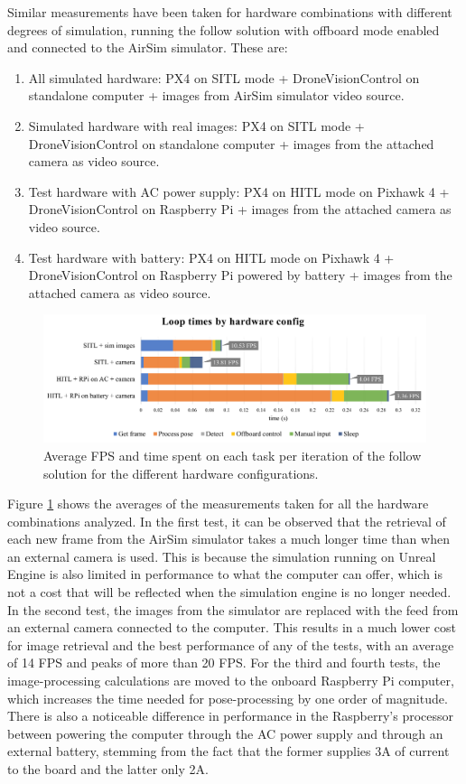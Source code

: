 Similar measurements have been taken for hardware combinations with different degrees of simulation, running the follow solution with offboard mode enabled and connected to the AirSim simulator.
These are:
\begin{enumerate}
    \item All simulated hardware: PX4 on SITL mode + DroneVisionControl on standalone computer + images from AirSim simulator video source.
    \item Simulated hardware with real images: PX4 on SITL mode + DroneVisionControl on standalone computer + images from the attached camera as video source.
    \item Test hardware with AC power supply: PX4 on HITL mode on Pixhawk 4 + DroneVisionControl on Raspberry Pi + images from the attached camera as video source.
    \item Test hardware with battery: PX4 on HITL mode on Pixhawk 4 + DroneVisionControl on Raspberry Pi powered by battery + images from the attached camera as video source.
\end{enumerate}


\begin{figure}
  \centering
  \includegraphics[width=\textwidth, keepaspectratio]{img/performance-graph.png}
  \caption{Average FPS and time spent on each task per iteration of the follow solution for the different hardware configurations.}
  \label{fig:perf-analysis}
\end{figure}


Figure \ref{fig:perf-analysis} shows the averages of the measurements taken for all the hardware combinations analyzed.
In the first test, it can be observed that the retrieval of each new frame from the AirSim simulator takes a much longer time than when an external camera is used.
This is because the simulation running on Unreal Engine is also limited in performance to what the computer can offer, which is not a cost that will be reflected when the simulation engine is no longer needed.
In the second test, the images from the simulator are replaced with the feed from an external camera connected to the computer. 
This results in a much lower cost for image retrieval and the best performance of any of the tests, with an average of 14 FPS and peaks of more than 20 FPS.
For the third and fourth tests, the image-processing calculations are moved to the onboard Raspberry Pi computer, which increases the time needed for pose-processing by one order of magnitude.
There is also a noticeable difference in performance in the Raspberry's processor between powering the computer through the AC power supply and through an external battery, stemming from the fact that the former supplies 3A of current to the board and the latter only 2A.

